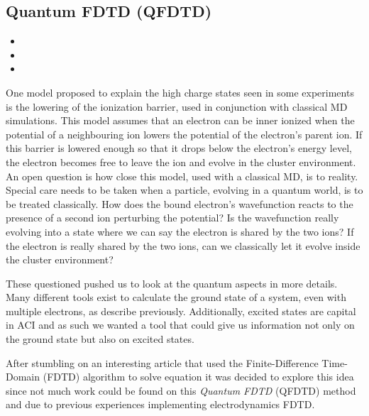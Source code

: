 \subsection{Quantum FDTD (QFDTD)}
\label{section:tools:qfdtd}

\begin{itemize}
\item {}
\item {}
\item {}
\end{itemize}


One model proposed to explain the high charge states seen in some experiments
is the lowering of the ionization barrier, used in conjunction with classical
MD simulations. This model assumes that an electron can be inner ionized when
the potential of a neighbouring ion lowers the potential of the electron's
parent ion. If this barrier is lowered enough so that it drops below the
electron's energy level, the electron becomes free to leave the ion and evolve
in the cluster environment. An open question is how close this model, used
with a classical MD, is to reality. Special care needs to be taken when a
particle, evolving in a quantum world, is to be treated classically. How does
the bound electron's wavefunction reacts to the presence of a second ion
perturbing the potential? Is the wavefunction really evolving into a state
where we can say the electron is shared by the two ions? If the electron is
really shared by the two ions, can we classically let it evolve inside the
cluster environment?

These questioned pushed us to look at the quantum aspects in more details. Many
different tools exist to calculate the ground state of a system, even with
multiple electrons, as describe previously. Additionally, excited states are
capital in ACI and as such we wanted a tool that could give us information not
only on the ground state but also on excited states.

After stumbling on an interesting article that used the Finite-Difference
Time-Domain (FDTD) algorithm to solve \schrodinger equation\cite{Sudiarta2007}
it was decided to explore this idea since not much work could be found on this
\textit{Quantum FDTD} (QFDTD) method and due to previous experiences
implementing electrodynamics FDTD.

